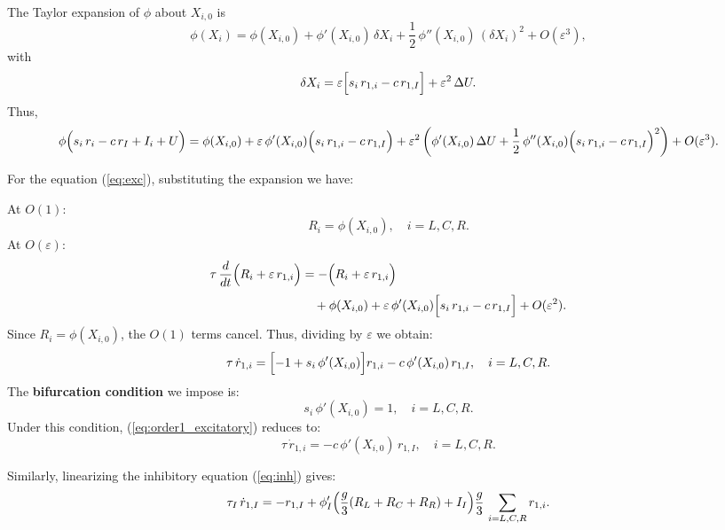 \documentclass[ENG]{fancynotes}
\begin{document}
The Taylor expansion of \(\phi\) about \(X_{i,0}\) is
\begin{equation}
  \phi(X_i) = \phi(X_{i,0}) + \phi'(X_{i,0})\,\delta X_i + \frac{1}{2}\,\phi''(X_{i,0})\,(\delta X_i)^2 + O(\varepsilon^3),
  \label{eq:taylor_exp}
\end{equation}
with
\[
\delta X_i = \varepsilon\Bigl[s_i\,r_{1,i} - c\,r_{1,I}\Bigr] + \varepsilon^2\,\Delta U.
\]
Thus,
\[
\phi\Bigl(s_i\,r_i - c\,r_I + I_i + U\Bigr) = \phi(X_{i,0}) + \varepsilon\,\phi'(X_{i,0})\Bigl(s_i\,r_{1,i} - c\,r_{1,I}\Bigr) + \varepsilon^2\left(\phi'(X_{i,0})\,\Delta U + \frac{1}{2}\,\phi''(X_{i,0})\Bigl(s_i\,r_{1,i} - c\,r_{1,I}\Bigr)^2\right) + O(\varepsilon^3).
\]


For the equation (\ref{eq:exc}), substituting the expansion we have:

At \(O(1)\):
\[
R_i = \phi(X_{i,0}), \quad i=L,C,R.
\]
At \(O(\varepsilon)\):
\begin{align}
  \tau\,\frac{d}{dt}\Bigl(R_i + \varepsilon\,r_{1,i}\Bigr) &= -\Bigl(R_i + \varepsilon\,r_{1,i}\Bigr) \nonumber\\[1mm]
  &\quad + \phi(X_{i,0}) + \varepsilon\,\phi'(X_{i,0})\Bigl[s_i\,r_{1,i}-c\,r_{1,I}\Bigr] + O(\varepsilon^2).
  \label{eq:order1}
\end{align}
Since \(R_i=\phi(X_{i,0})\), the \(O(1)\) terms cancel. Thus, dividing by \(\varepsilon\) we obtain:
\begin{equation}
  \tau\,\dot{r}_{1,i} = \Bigl[-1 + s_i\,\phi'(X_{i,0})\Bigr] r_{1,i} - c\,\phi'(X_{i,0})\,r_{1,I}, \quad i=L,C,R.
  \label{eq:order1_excitatory}
\end{equation}
The \textbf{bifurcation condition} we impose is:
\begin{equation}
  s_i\,\phi'(X_{i,0}) = 1, \quad i=L,C,R.
  \label{eq:bifurcation_condition}
\end{equation}
Under this condition, (\ref{eq:order1_excitatory}) reduces to:
\begin{equation}
  \tau\,\dot{r}_{1,i} = - c\,\phi'(X_{i,0})\,r_{1,I}, \quad i=L,C,R.
  \label{eq:order1_ex_final}
\end{equation}

Similarly, linearizing the inhibitory equation (\ref{eq:inh}) gives:
\begin{equation}
  \tau_I\,\dot{r}_{1,I} = -r_{1,I} + \phi_I'\Bigl(\frac{g}{3}(R_L+R_C+R_R)+I_I\Bigr)\frac{g}{3}\,\sum_{i=L,C,R}r_{1,i}.
  \label{eq:order1_inhibitory}
\end{equation}
\end{document}
